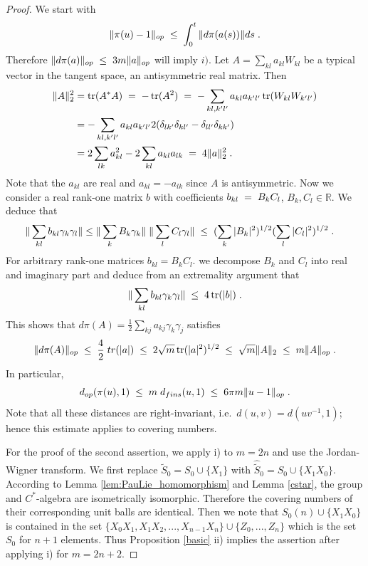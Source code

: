 \documentclass[12pt, a4-paper]{amsart}
\newcommand{\tr}{\operatorname{tr}}
\numberwithin{equation}{section}
\newcommand{\kl}{\pl \le \pl}
\newcommand{\lel}{\pl = \pl}
\newcommand{\rz}{{\mathbb R}}
\newcommand{\pl}{\hspace{.1cm}}
\begin{document}
\begin{proof} We start with 
 \[ \|\pi(u)-1\|_{op} \kl \int_0^t \|d\pi(a(s))\| ds \pl .\] 
Therefore $\|d\pi(a)\|_{op} \kl 3m \|a\|_{op}$ will imply $i)$. Let $A=\sum_{kl} a_{kl} W_{kl}$ be a typical vector in the tangent space, an antisymmetric real matrix. Then
 \begin{align*}
  \|A\|_2^2 &=  \tr(A^*A) \lel -\tr(A^2) \lel - \sum_{kl,k'l'} a_{kl}a_{k'l'} \tr(W_{kl}W_{k'l'}) \\ 
 &=  -\sum_{kl,k'l'}  a_{kl}a_{k'l'}  2(\delta_{lk'}\delta_{kl'}-\delta_{ll'}\delta_{kk'}) \\
 &= 2 \sum_{lk} a_{kl}^2 - 2 \sum_{kl}a_{kl}a_{lk}  \lel 4 \|a\|_2^2 \pl .
 \end{align*}
Note that the $a_{kl}$ are real and $a_{kl}=-a_{lk}$ since $A$ is antisymmetric. Now we consider a real rank-one matrix $b$ with coefficients $b_{kl}\lel B_kC_l$, $B_k,C_l\in \rz$.  We deduce that 
 \begin{align*}
 \|\sum_{kl} b_{kl}\gamma_k\gamma_l\|
 &\le  \| \sum_k B_k\gamma_k\| \pl \|\sum_l C_l\gamma_l\|
 \kl (\sum_k|B_k|^2)^{1/2} (\sum_l |C_l|^2)^{1/2} \pl .
 \end{align*}
For arbitrary rank-one matrices $b_{kl}=B_kC_l$. we decompose $B_k$ and $C_l$ into real and imaginary part and deduce from an extremality argument that 
\[   \|\sum_{kl} b_{kl}\gamma_k\gamma_l\| \kl 4 \tr(|b|) \pl .\] 
This shows that $d\pi(A)=\frac{1}{2} \sum_{kj} a_{kj}\gamma_{k}\gamma_j$ satisfies 
 \[ \|d\pi(A)\|_{op} \kl \frac{4}{2}   \pl tr(|a|) \kl 2 \sqrt{m} \tr(|a|^2)^{1/2} \kl \sqrt{m} \|A\|_2
 \kl m \|A\|_{op}
   \pl .\]   
In particular,
 \[ d_{op}(\pi(u),1) \kl m  \pl d_{fins}(u,1) \kl 6\pi m  \|u-1\|_{op} \pl .\] 
Note that all these distances are right-invariant, i.e.\ $d(u,v)=d(uv^{-1},1)$; hence this estimate applies to covering numbers. 

For the proof  of the second assertion, we apply i) to $m=2n$ and use the Jordan-Wigner transform.  We first replace $\tilde{S}_0=S_0\cup \{X_1\}$ with $\hat{\tilde{S}}_0= S_0\cup \{X_1X_0\}$. According to Lemma \ref{lem:PauLie_homomorphism} and Lemma \ref{cstar}, the group and $C^*$-algebra are isometrically isomorphic. Therefore the covering numbers of their corresponding unit balls are identical. Then we note that $S_0(n)\cup \{X_1X_0\}$ is contained in the set $\{X_0X_1,X_1X_2,...,X_{n-1}X_n\}\cup \{Z_0,...,Z_n\}$ which is the set $S_0$ for $n+1$ elements. Thus Proposition \eqref{basic} ii) implies the assertion after applying i) for $m=2n+2$. 
\end{proof}
\end{document}
